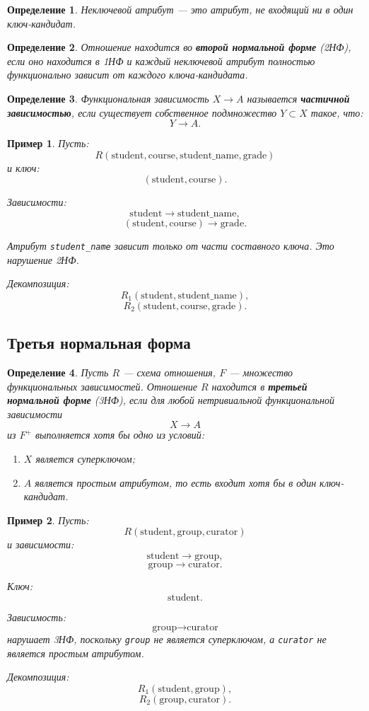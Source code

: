 \documentclass[12pt,a4paper]{article}
\newtheorem{definition}{Определение}[section]
\newtheorem{example}{Пример}[section]
\theoremstyle{remark}
\begin{document}
\begin{definition}
Неключевой атрибут --- это атрибут, не входящий ни в один ключ-кандидат.
\end{definition}

\begin{definition}
Отношение находится во \textbf{второй нормальной форме} (2НФ), если оно находится в 1НФ и каждый неключевой атрибут полностью функционально зависит от каждого ключа-кандидата.
\end{definition}

\begin{definition}
Функциональная зависимость $X \to A$ называется \textbf{частичной зависимостью}, если существует собственное подмножество $Y \subset X$ такое, что:
\[
Y \to A.
\]
\end{definition}

\begin{example}
Пусть:
\[
R(\text{student}, \text{course}, \text{student\_name}, \text{grade})
\]
и ключ:
\[
(\text{student}, \text{course}).
\]

Зависимости:
\[
\text{student} \to \text{student\_name},
\]
\[
(\text{student}, \text{course}) \to \text{grade}.
\]

Атрибут \texttt{student\_name} зависит только от части составного ключа. Это нарушение 2НФ.

Декомпозиция:
\[
R_1(\text{student}, \text{student\_name}),
\]
\[
R_2(\text{student}, \text{course}, \text{grade}).
\]
\end{example}

\subsection{Третья нормальная форма}

\begin{definition}
Пусть $R$ --- схема отношения, $F$ --- множество функциональных зависимостей.
Отношение $R$ находится в \textbf{третьей нормальной форме} (3НФ), если для любой нетривиальной функциональной зависимости
\[
X \to A
\]
из $F^+$ выполняется хотя бы одно из условий:
\begin{enumerate}
    \item $X$ является суперключом;
    \item $A$ является простым атрибутом, то есть входит хотя бы в один ключ-кандидат.
\end{enumerate}
\end{definition}

\begin{example}
Пусть:
\[
R(\text{student}, \text{group}, \text{curator})
\]
и зависимости:
\[
\text{student} \to \text{group},
\]
\[
\text{group} \to \text{curator}.
\]

Ключ:
\[
\text{student}.
\]

Зависимость:
\[
\text{group} \to \text{curator}
\]
нарушает 3НФ, поскольку \texttt{group} не является суперключом, а \texttt{curator} не является простым атрибутом.

Декомпозиция:
\[
R_1(\text{student}, \text{group}),
\]
\[
R_2(\text{group}, \text{curator}).
\]
\end{example}
\end{document}
